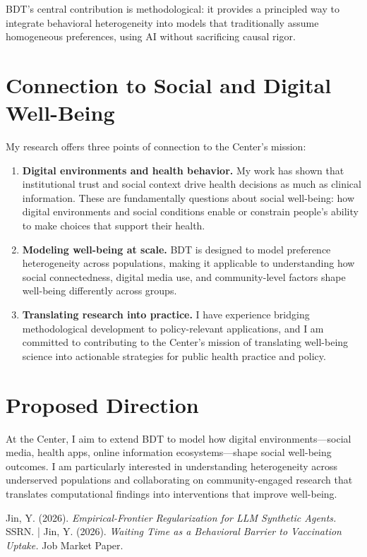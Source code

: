 \documentclass[11pt,a4paper]{article}
\begin{document}
BDT's central contribution is methodological: it provides a principled way to integrate behavioral heterogeneity into models that traditionally assume homogeneous preferences, using AI without sacrificing causal rigor.

\section*{Connection to Social and Digital Well-Being}

My research offers three points of connection to the Center's mission:

\begin{enumerate}[leftmargin=*, nosep]
    \item \textbf{Digital environments and health behavior.} My work has shown that institutional trust and social context drive health decisions as much as clinical information. These are fundamentally questions about social well-being: how digital environments and social conditions enable or constrain people's ability to make choices that support their health.
    \item \textbf{Modeling well-being at scale.} BDT is designed to model preference heterogeneity across populations, making it applicable to understanding how social connectedness, digital media use, and community-level factors shape well-being differently across groups.
    \item \textbf{Translating research into practice.} I have experience bridging methodological development to policy-relevant applications, and I am committed to contributing to the Center's mission of translating well-being science into actionable strategies for public health practice and policy.
\end{enumerate}

\section*{Proposed Direction}

At the Center, I aim to extend BDT to model how digital environments---social media, health apps, online information ecosystems---shape social well-being outcomes. I am particularly interested in understanding heterogeneity across underserved populations and collaborating on community-engaged research that translates computational findings into interventions that improve well-being.

\vfill
{} {\small Jin, Y. (2026). \emph{Empirical-Frontier Regularization for LLM Synthetic Agents.} SSRN. \;|\; Jin, Y. (2026). \emph{Waiting Time as a Behavioral Barrier to Vaccination Uptake.} Job Market Paper.}
\end{document}
